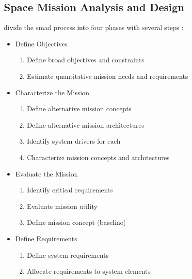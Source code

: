 \subsection{Space Mission Analysis and Design}
\label{sec:space-mission-analysis-and-design}
\citeauthor{wertz_space_1999} divide the \ac{smad} process into four phases with several steps \autocite[p. 2]{wertz_space_1999}:
\begin{itemize}
    \item Define Objectives
        \begin{enumerate}
            \item Define broad objectives and constraints
            \item Estimate quantitative mission needs and requirements
        \end{enumerate}
    \item Characterize the Mission
        \begin{enumerate}[start=3]
            \item Define alternative mission concepts
            \item Define alternative mission architectures
            \item Identify system drivers for each
            \item Characterize mission concepts and architectures
        \end{enumerate}
    \item Evaluate the Mission
        \begin{enumerate}[start=7]
            \item Identify critical requirements
            \item Evaluate mission utility
            \item Define mission concept (baseline)
        \end{enumerate}
    \item Define Requirements
        \begin{enumerate}[start=10]
            \item Define system requirements
            \item Allocate requirements to system elements
        \end{enumerate}
\end{itemize}
